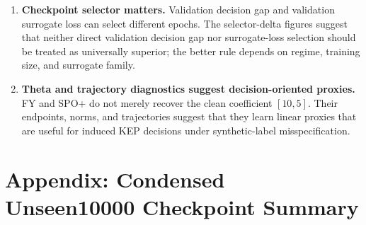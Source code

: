\documentclass[11pt]{article}
\begin{document}
\begin{enumerate}
  \item \textbf{Checkpoint selector matters.} Validation decision gap and validation surrogate loss can select different epochs. The selector-delta figures suggest that neither direct validation decision gap nor surrogate-loss selection should be treated as universally superior; the better rule depends on regime, training size, and surrogate family.

  \item \textbf{Theta and trajectory diagnostics suggest decision-oriented proxies.} FY and SPO+ do not merely recover the clean coefficient \([10,5]\). Their endpoints, norms, and trajectories suggest that they learn linear proxies that are useful for induced KEP decisions under synthetic-label misspecification.
\end{enumerate}

\clearpage
\section*{Appendix: Condensed Unseen10000 Checkpoint Summary}

\begin{table}[H]
\centering
\caption{Condensed large-unseen summary from \texttt{step2\_unseen10000\_all\_checkpoints\_summary.csv}. Each cell reports mean normalized decision gap averaged over train sizes \(50,200,600,1200\); lower is better. Bold marks the lowest checkpoint in each regime using full-precision values.}
\label{tab:condensed-unseen10000-all-checkpoints}
\end{table}
\end{document}
